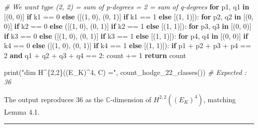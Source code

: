 \documentclass[
  11pt,
  a4paper,
]{amsart}
\newenvironment{Shaded}{}{}
\newcommand{\BuiltInTok}[1]{\textcolor[rgb]{0.00,0.50,0.00}{#1}}
\newcommand{\CommentTok}[1]{\textcolor[rgb]{0.38,0.63,0.69}{\textit{#1}}}
\newcommand{\ControlFlowTok}[1]{\textcolor[rgb]{0.00,0.44,0.13}{\textbf{#1}}}
\newcommand{\DecValTok}[1]{\textcolor[rgb]{0.25,0.63,0.44}{#1}}
\newcommand{\KeywordTok}[1]{\textcolor[rgb]{0.00,0.44,0.13}{\textbf{#1}}}
\newcommand{\NormalTok}[1]{#1}
\newcommand{\OperatorTok}[1]{\textcolor[rgb]{0.40,0.40,0.40}{#1}}
\newcommand{\StringTok}[1]{\textcolor[rgb]{0.25,0.44,0.63}{#1}}
\begin{document}
\begin{Shaded}
\begin{Highlighting}[]
                    \CommentTok{\# We want type (2, 2) = sum of p{-}degrees = 2 = sum of q{-}degrees}
                    \ControlFlowTok{for}\NormalTok{ p1, q1 }\KeywordTok{in}\NormalTok{ [(}\DecValTok{0}\NormalTok{, }\DecValTok{0}\NormalTok{)] }\ControlFlowTok{if}\NormalTok{ k1 }\OperatorTok{==} \DecValTok{0} \ControlFlowTok{else}\NormalTok{ ([(}\DecValTok{1}\NormalTok{, }\DecValTok{0}\NormalTok{), (}\DecValTok{0}\NormalTok{, }\DecValTok{1}\NormalTok{)] }\ControlFlowTok{if}\NormalTok{ k1 }\OperatorTok{==} \DecValTok{1} \ControlFlowTok{else}\NormalTok{ [(}\DecValTok{1}\NormalTok{, }\DecValTok{1}\NormalTok{)]):}
                        \ControlFlowTok{for}\NormalTok{ p2, q2 }\KeywordTok{in}\NormalTok{ [(}\DecValTok{0}\NormalTok{, }\DecValTok{0}\NormalTok{)] }\ControlFlowTok{if}\NormalTok{ k2 }\OperatorTok{==} \DecValTok{0} \ControlFlowTok{else}\NormalTok{ ([(}\DecValTok{1}\NormalTok{, }\DecValTok{0}\NormalTok{), (}\DecValTok{0}\NormalTok{, }\DecValTok{1}\NormalTok{)] }\ControlFlowTok{if}\NormalTok{ k2 }\OperatorTok{==} \DecValTok{1} \ControlFlowTok{else}\NormalTok{ [(}\DecValTok{1}\NormalTok{, }\DecValTok{1}\NormalTok{)]):}
                            \ControlFlowTok{for}\NormalTok{ p3, q3 }\KeywordTok{in}\NormalTok{ [(}\DecValTok{0}\NormalTok{, }\DecValTok{0}\NormalTok{)] }\ControlFlowTok{if}\NormalTok{ k3 }\OperatorTok{==} \DecValTok{0} \ControlFlowTok{else}\NormalTok{ ([(}\DecValTok{1}\NormalTok{, }\DecValTok{0}\NormalTok{), (}\DecValTok{0}\NormalTok{, }\DecValTok{1}\NormalTok{)] }\ControlFlowTok{if}\NormalTok{ k3 }\OperatorTok{==} \DecValTok{1} \ControlFlowTok{else}\NormalTok{ [(}\DecValTok{1}\NormalTok{, }\DecValTok{1}\NormalTok{)]):}
                                \ControlFlowTok{for}\NormalTok{ p4, q4 }\KeywordTok{in}\NormalTok{ [(}\DecValTok{0}\NormalTok{, }\DecValTok{0}\NormalTok{)] }\ControlFlowTok{if}\NormalTok{ k4 }\OperatorTok{==} \DecValTok{0} \ControlFlowTok{else}\NormalTok{ ([(}\DecValTok{1}\NormalTok{, }\DecValTok{0}\NormalTok{), (}\DecValTok{0}\NormalTok{, }\DecValTok{1}\NormalTok{)] }\ControlFlowTok{if}\NormalTok{ k4 }\OperatorTok{==} \DecValTok{1} \ControlFlowTok{else}\NormalTok{ [(}\DecValTok{1}\NormalTok{, }\DecValTok{1}\NormalTok{)]):}
                                    \ControlFlowTok{if}\NormalTok{ p1 }\OperatorTok{+}\NormalTok{ p2 }\OperatorTok{+}\NormalTok{ p3 }\OperatorTok{+}\NormalTok{ p4 }\OperatorTok{==} \DecValTok{2} \KeywordTok{and}\NormalTok{ q1 }\OperatorTok{+}\NormalTok{ q2 }\OperatorTok{+}\NormalTok{ q3 }\OperatorTok{+}\NormalTok{ q4 }\OperatorTok{==} \DecValTok{2}\NormalTok{:}
\NormalTok{                                        count }\OperatorTok{+=} \DecValTok{1}
    \ControlFlowTok{return}\NormalTok{ count}

\BuiltInTok{print}\NormalTok{(}\StringTok{"dim H\^{}\{2,2\}((E\_K)\^{}4, C) ="}\NormalTok{, count\_hodge\_22\_classes())  }\CommentTok{\# Expected : 36}
\end{Highlighting}
\end{Shaded}

The output reproduces \(36\) as the \(\mathbb{C}\)-dimension of \(H^{2,2}((E_K)^4)\), matching Lemma 4.1.

\begin{center}\rule{0.5\linewidth}{0.5pt}\end{center}
\end{document}
